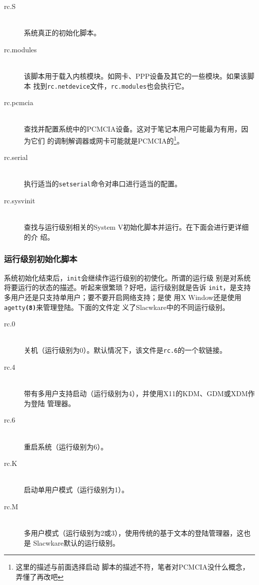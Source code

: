 \begin{description}
\item[rc.S] \hfill \\
  系统真正的初始化脚本。
\item[rc.modules] \hfill \\
  该脚本用于载入内核模块。如网卡、PPP设备及其它的一些模块。如果该脚本
  找到\texttt{rc.netdevice}文件，\texttt{rc.modules}也会执行它。
\item[rc.pcmcia] \hfill \\
  查找并配置系统中的PCMCIA设备。这对于笔记本用户可能最为有用，因为它们
  的调制解调器或网卡可能就是PCMCIA的\footnote{这里的描述与前面选择启动
    脚本的描述不符，笔者对PCMCIA没什么概念，弄懂了再改吧}。
\item[rc.serial] \hfill \\
  执行适当的\texttt{setserial}命令对串口进行适当的配置。
\item[rc.sysvinit] \hfill \\
  查找与运行级别相关的System V初始化脚本并运行。在下面会进行更详细的介
  绍。
\end{description}

\subsubsection{运行级别初始化脚本}
\label{sec:systemConfig:systemOverview:etcRcd:runlevelInit}

系统初始化结束后，\texttt{init}会继续作运行级别的初使化。所谓的运行级
别是对系统将要运行的状态的描述。听起来很繁琐？好吧，运行级别就是告诉
\texttt{init}，是支持多用户还是只支持单用户；要不要开启网络支持；是使
用X Window还是使用\texttt{agetty\textbf{(8)}}来管理登陆。下面的文件定
义了Slacwkare中的不同运行级别。

\begin{description}
\item[rc.0] \hfill \\
  关机（运行级别为0）。默认情况下，该文件是\texttt{rc.6}的一个软链接。
\item[rc.4] \hfill \\
  带有多用户支持启动（运行级别为4），并使用X11的KDM、GDM或XDM作为登陆
  管理器。
\item[rc.6] \hfill \\
  重启系统（运行级别为6）。
\item[rc.K] \hfill \\
  启动单用户模式（运行级别为1）。
\item[rc.M] \hfill \\
  多用户模式（运行级别为2或3），使用传统的基于文本的登陆管理器，这也是
  Slacwkare默认的运行级别。
\end{description}

